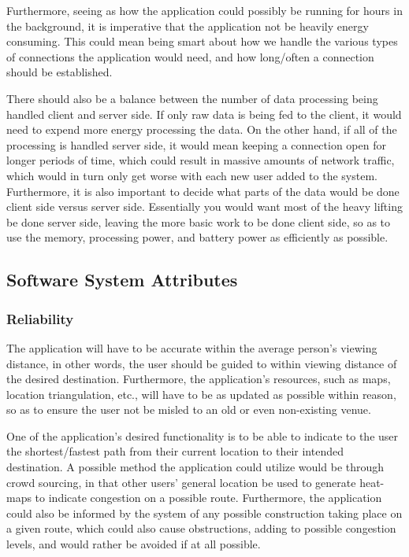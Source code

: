 \documentclass[12pt]{article}
\begin{document}
	Furthermore, seeing as how the application could possibly be running for hours in the background, it is imperative that the application not be heavily energy consuming.  This could mean being smart about how we handle the various types of connections the application would need, and how long/often a connection should be established.  
	
	There should also be a balance between the number of data processing being handled client and server side.  If only raw data is being fed to the client, it would need to expend more energy processing the data.  On the other hand, if all of the processing is handled server side, it would mean keeping a connection open for longer periods of time, which could result in massive amounts of network traffic, which would in turn only get worse with each new user added to the system.  Furthermore, it is also important to decide what parts of the data would be done client side versus server side.  Essentially you would want most of the heavy lifting be done server side, leaving the more basic work to be done client side, so as to use the memory, processing power, and battery power as efficiently as possible.   
	
	
	\subsection{Software System Attributes}
	
		\subsubsection{Reliability}
		The application will have to be accurate within the average person’s viewing distance, in other words, the user should be guided to within viewing distance of the desired destination.  Furthermore, the application’s resources, such as maps, location triangulation, etc., will have to be as updated as possible within reason, so as to ensure the user not be misled to an old or even non-existing venue.  
		
		One of the application’s desired functionality is to be able to indicate to the user the shortest/fastest path from their current location to their intended destination.  A possible method the application could utilize would be through crowd sourcing, in that other users’ general location be used to generate heat-maps to indicate congestion on a possible route.  Furthermore, the application could also be informed by the system of any possible construction taking place on a given route, which could also cause obstructions, adding to possible congestion levels, and would rather be avoided if at all possible.  
		
\end{document}
